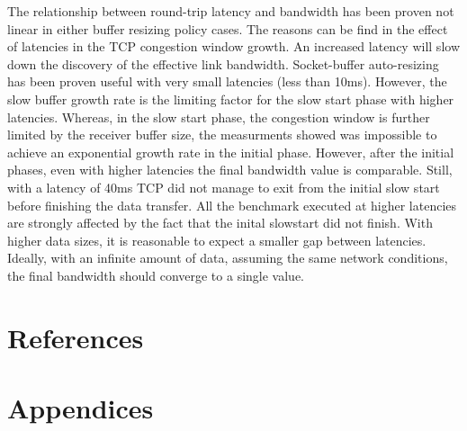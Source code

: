 \documentclass[a4paper,10pt]{article}
\begin{document}
The relationship between round-trip latency and bandwidth has been proven not linear in either buffer resizing policy cases. The reasons can be find in the effect of latencies in the TCP congestion window growth. An increased latency will slow down the discovery of the effective link bandwidth. 
Socket-buffer auto-resizing has been proven useful with very small latencies (less than 10ms). However, the slow buffer growth rate is the limiting factor for the slow start phase with higher latencies. Whereas, in the slow start phase, the congestion window is further limited by the receiver buffer size, the measurments showed was impossible to achieve an exponential growth rate in the initial phase. However, after the initial phases, even with higher latencies the final bandwidth value is comparable. Still, with a latency of 40ms TCP did not manage to exit from the initial slow start before finishing the data transfer. All the benchmark executed at higher latencies are strongly affected by the fact that the inital slowstart did not finish. With higher data sizes, it is reasonable to expect a smaller gap between latencies. Ideally, with an infinite amount of data, assuming the same network conditions, the final bandwidth should converge to a single value. %

\newpage

\section{References}

\printbibliography

\section{Appendices}
\end{document}
